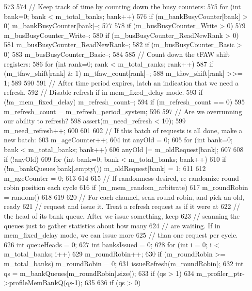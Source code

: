\begin{DoxyCode}
573 {
574     // Keep track of time by counting down the busy counters:
575     for (int bank=0; bank < m_total_banks; bank++) {
576         if (m_bankBusyCounter[bank] > 0) m_bankBusyCounter[bank]--;
577     }
578     if (m_busBusyCounter_Write > 0)
579         m_busBusyCounter_Write--;
580     if (m_busBusyCounter_ReadNewRank > 0)
581         m_busBusyCounter_ReadNewRank--;
582     if (m_busBusyCounter_Basic > 0)
583         m_busBusyCounter_Basic--;
584 
585     // Count down the tFAW shift registers:
586     for (int rank=0; rank < m_total_ranks; rank++) {
587         if (m_tfaw_shift[rank] & 1) m_tfaw_count[rank]--;
588         m_tfaw_shift[rank] >>= 1;
589     }
590 
591     // After time period expires, latch an indication that we need a refresh.
592     // Disable refresh if in mem_fixed_delay mode.
593     if (!m_mem_fixed_delay) m_refresh_count--;
594     if (m_refresh_count == 0) {
595         m_refresh_count = m_refresh_period_system;
596 
597         // Are we overrunning our ability to refresh?
598         assert(m_need_refresh < 10);
599         m_need_refresh++;
600     }
601 
602     // If this batch of requests is all done, make a new batch:
603     m_ageCounter++;
604     int anyOld = 0;
605     for (int bank=0; bank < m_total_banks; bank++) {
606         anyOld |= m_oldRequest[bank];
607     }
608     if (!anyOld) {
609         for (int bank=0; bank < m_total_banks; bank++) {
610             if (!m_bankQueues[bank].empty()) m_oldRequest[bank] = 1;
611         }
612         m_ageCounter = 0;
613     }
614 
615     // If randomness desired, re-randomize round-robin position each cycle
616     if (m_mem_random_arbitrate) {
617         m_roundRobin = random() %
618     }
619 
620     // For each channel, scan round-robin, and pick an old, ready
621     // request and issue it.  Treat a refresh request as if it were at
622     // the head of its bank queue.  After we issue something, keep
623     // scanning the queues just to gather statistics about how many
624     // are waiting.  If in mem_fixed_delay mode, we can issue more
625     // than one request per cycle.
626     int queueHeads = 0;
627     int banksIssued = 0;
628     for (int i = 0; i < m_total_banks; i++) {
629         m_roundRobin++;
630         if (m_roundRobin >= m_total_banks) m_roundRobin = 0;
631         issueRefresh(m_roundRobin);
632         int qs = m_bankQueues[m_roundRobin].size();
633         if (qs > 1) {
634             m_profiler_ptr->profileMemBankQ(qs-1);
635         }
636         if (qs > 0) {
}}}
\end{DoxyCode}

